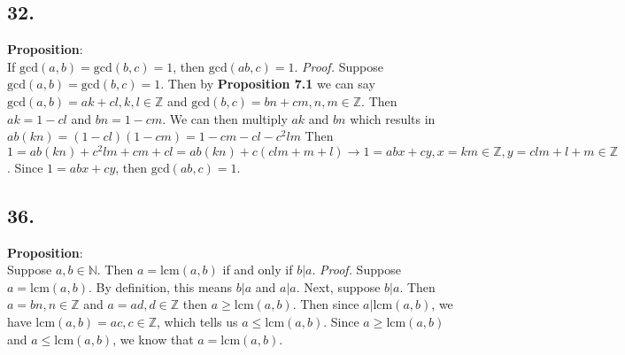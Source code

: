 \documentclass[12pt]{article}
\begin{document}
\begin{minipage}[t]{0.45\textwidth}

	
\subsection*{32.}
\textbf{Proposition}:  \\If $ \text{gcd}(a,b)=\text{gcd}(b,c)=1 $, then $ \text{gcd}(ab,c)=1 $.  
\newline\textit{Proof.} Suppose $ \text{gcd}(a,b)=\text{gcd}(b,c)=1 $. Then by \textbf{Proposition 7.1} we can say $ \text{gcd}(a,b)=ak+cl, k,l\in\mathbb{Z} $ and $ \text{gcd}(b,c)=bn+cm, n,m\in\mathbb{Z} $. Then $ ak=1-cl $ and $ bn=1-cm $. We can then multiply $ ak $ and $ bn $ which results in $ ab(kn)=(1-cl)(1-cm)=1-cm-cl-c^2lm $ Then $ 1=ab(kn)+c^2lm+cm+cl=ab(kn)+c(clm+m+l)\rightarrow 1=abx+cy, x=km\in\mathbb{Z},y=clm+l+m\in\mathbb{Z}  $. Since $ 1=abx+cy $, then $ \text{gcd}(ab,c)=1 $.

	
\subsection*{36.}
\textbf{Proposition}:  \\Suppose $ a,b\in\mathbb{N} $. Then $ a=\text{lcm}(a,b) $ if and only if $ b|a $. 
\newline\textit{Proof.} Suppose $ a=\text{lcm}(a,b) $. By definition, this means $ b|a $ and $ a|a $.
Next, suppose $ b|a $. Then $ a=bn, n\in\mathbb{Z} $ and $ a=ad, d\in\mathbb{Z} $ then $ a\geq \text{lcm}(a,b) $. Then since $ a|\text{lcm}(a,b) $, we have $ \text{lcm}(a,b) =ac, c\in\mathbb{Z}$, which tells us $ a\leq \text{lcm}(a,b) $. Since  $ a\geq \text{lcm}(a,b) $ and $ a\leq \text{lcm}(a,b) $, we know that $ a= \text{lcm}(a,b) $.  


\end{minipage}
\pagebreak


\end{document}
